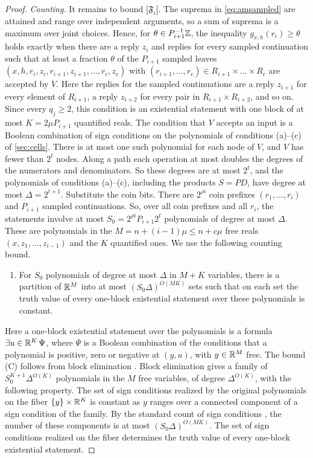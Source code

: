 \begin{proof}
\emph{Counting.}
It remains to bound $|\mathfrak F_i|$.
The suprema in \eqref{eq:amsampled} are attained and range over independent arguments, so a sum of suprema is a maximum over joint choices.
Hence, for $\theta\in P_{i+1}^{-1}\mathbb{Z}$, the inequality $g_{x,h}(r_i)\ge\theta$ holds exactly when there are a reply $z_i$ and replies for every sampled continuation such that at least a fraction $\theta$ of the $P_{i+1}$ sampled leaves $(x,h,r_i,z_i,r_{i+1},z_{i+1},\dots,r_c,z_c)$ with $(r_{i+1},\dots,r_c)\in R_{i+1}\times\dots\times R_c$ are accepted by $V$.
Here the replies for the sampled continuations are a reply $z_{i+1}$ for every element of $R_{i+1}$, a reply $z_{i+2}$ for every pair in $R_{i+1}\times R_{i+2}$, and so on.
Since every $q_j\ge2$, this condition is an existential statement with one block of at most $K=2\mu P_{i+1}$ quantified reals.
The condition that $V$ accepts an input is a Boolean combination of sign conditions on the polynomials of conditions \textup{(a)}--\textup{(c)} of \cref{sec:cells}.
There is at most one such polynomial for each node of $V$, and $V$ has fewer than $2^t$ nodes.
Along a path each operation at most doubles the degrees of the numerators and denominators.
So these degrees are at most $2^t$, and the polynomials of conditions \textup{(a)}--\textup{(c)}, including the products $S=PD$, have degree at most $\Delta=2^{t+1}$.
Substitute the coin bits.
There are $2^{\rho i}$ coin prefixes $(r_1,\dots,r_i)$ and $P_{i+1}$ sampled continuations.
So, over all coin prefixes and all $r_i$, the statements involve at most $S_0=2^{\rho i}P_{i+1}2^{t}$ polynomials of degree at most $\Delta$.
These are polynomials in the $M=n+(i-1)\mu\le n+c\mu$ free reals $(x,z_1,\dots,z_{i-1})$ and the $K$ quantified ones.
We use the following counting bound.
\begin{enumerate}[label=\textup{(C)},leftmargin=3em]
\item For $S_0$ polynomials of degree at most $\Delta$ in $M+K$ variables, there is a partition of $\mathbb{R}^M$ into at most $(S_0\Delta)^{O(MK)}$ sets such that on each set the truth value of every one-block existential statement over these polynomials is constant.
\end{enumerate}
Here a one-block existential statement over the polynomials is a formula $\exists u\in\mathbb{R}^K\,\Psi$, where $\Psi$ is a Boolean combination of the conditions that a polynomial is positive, zero or negative at $(y,u)$, with $y\in\mathbb{R}^M$ free.
The bound \textup{(C)} follows from block elimination \cite[Algorithm~14.1]{BPR06}.
Block elimination gives a family of $S_0^{K+1}\Delta^{O(K)}$ polynomials in the $M$ free variables, of degree $\Delta^{O(K)}$, with the following property.
The set of sign conditions realized by the original polynomials on the fiber $\{y\}\times\mathbb{R}^K$ is constant as $y$ ranges over a connected component of a sign condition of the family.
By the standard count of sign conditions \cite[Proposition~7.31]{BPR06}, the number of these components is at most $(S_0\Delta)^{O(MK)}$.
The set of sign conditions realized on the fiber determines the truth value of every one-block existential statement.


\end{proof}
